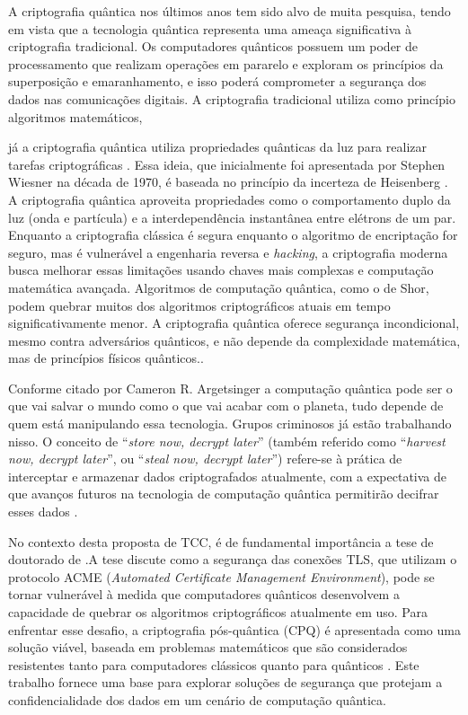 A criptografia quântica nos últimos anos tem sido alvo de muita pesquisa, tendo em vista que a tecnologia quântica representa uma ameaça significativa à criptografia tradicional. Os computadores quânticos possuem um poder de processamento que realizam operações em pararelo e exploram os princípios da superposição e emaranhamento, e isso poderá comprometer a segurança dos dados nas comunicações digitais. A criptografia tradicional utiliza como princípio algoritmos matemáticos, {já a criptografia quântica utiliza propriedades quânticas da luz para realizar tarefas criptográficas \cite{mitra2017quantum}. Essa ideia, que  inicialmente foi apresentada por Stephen Wiesner na década de 1970, é baseada no princípio da incerteza de Heisenberg \cite{heisenberg1927anschaulichen}. A criptografia quântica aproveita propriedades como o comportamento duplo da luz (onda e partícula) e a interdependência instantânea entre elétrons de um par. Enquanto a criptografia clássica é segura enquanto o algoritmo de encriptação for seguro, mas é vulnerável a engenharia reversa e \textit{hacking}, a criptografia moderna busca melhorar essas limitações usando chaves mais complexas e computação matemática avançada. Algoritmos de computação quântica, como o de Shor, podem quebrar muitos dos algoritmos criptográficos atuais em tempo significativamente menor. A criptografia quântica oferece segurança incondicional, mesmo contra adversários quânticos, e não depende da complexidade matemática, mas de princípios físicos quânticos.\cite{mitra2017quantum}.
	
	Conforme citado por Cameron R. Argetsinger a computação quântica pode ser o que vai salvar o mundo como o que vai acabar com o planeta, tudo depende de quem está manipulando essa tecnologia. Grupos criminosos já estão trabalhando nisso. O conceito de ``\textit{store now, decrypt later}'' (também referido como ``\textit{harvest now, decrypt later}'', ou ``\textit{steal now, decrypt later}'') refere-se à prática de interceptar e armazenar dados criptografados atualmente, com a expectativa de que avanços futuros na tecnologia de computação quântica permitirão decifrar esses dados \cite{argetsinger2024promise}.
	
	No contexto desta proposta de TCC, é de fundamental importância a tese de doutorado de \citeauthor{giron2023}.A tese discute como a segurança das conexões TLS, que utilizam o protocolo ACME (\textit{Automated Certificate Management Environment}), pode se tornar vulnerável à medida que computadores quânticos desenvolvem a capacidade de quebrar os algoritmos criptográficos atualmente em uso. Para enfrentar esse desafio, a criptografia pós-quântica (CPQ) é apresentada como uma solução viável, baseada em problemas matemáticos que são considerados resistentes tanto para computadores clássicos quanto para quânticos \cite{giron2023}. Este trabalho fornece uma base para explorar soluções de segurança que protejam a confidencialidade dos dados em um cenário de computação quântica.
	
}
